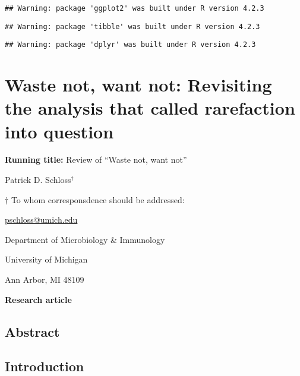 \documentclass[
]{article}
\author{}
\date{\vspace{-2.5em}}
\begin{document}
\begin{verbatim}
## Warning: package 'ggplot2' was built under R version 4.2.3
\end{verbatim}

\begin{verbatim}
## Warning: package 'tibble' was built under R version 4.2.3
\end{verbatim}

\begin{verbatim}
## Warning: package 'dplyr' was built under R version 4.2.3
\end{verbatim}

\hypertarget{waste-not-want-not-revisiting-the-analysis-that-called-rarefaction-into-question}{%
\section{Waste not, want not: Revisiting the analysis that called
rarefaction into
question}\label{waste-not-want-not-revisiting-the-analysis-that-called-rarefaction-into-question}}

\vspace{20mm}

\textbf{Running title:} Review of ``Waste not, want not''

\vspace{20mm}

Patrick D. Schloss\({^\dagger}\)

\vspace{40mm}

\({\dagger}\) To whom corresponsdence should be addressed:

\href{mailto:pschloss@umich.edu}{pschloss@umich.edu}

Department of Microbiology \& Immunology

University of Michigan

Ann Arbor, MI 48109

\vspace{20mm}

\textbf{Research article}

\newpage

\hypertarget{abstract}{%
\subsection{Abstract}\label{abstract}}

\newpage

\hypertarget{introduction}{%
\subsection{Introduction}\label{introduction}}
\end{document}
